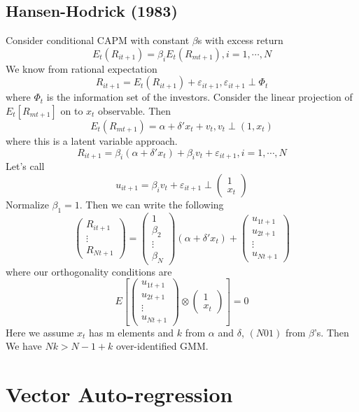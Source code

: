 \documentclass[11pt, a4paper, oneside]{article}
\theoremstyle{definition}
\theoremstyle{proposition}
\theoremstyle{corollary}
\theoremstyle{lemma}
\theoremstyle{theorem}
\begin{document}
\subsection{Hansen-Hodrick (1983)}
Consider conditional CAPM with constant $\beta$s with excess return 
$$E_t(R_{it+1}) = \beta_iE_t(R_{mt+1}), i =1, \cdots, N$$
We know from rational expectation 
$$R_{it+1} = E_t(R_{it+1}) + \varepsilon_{it+1}, \varepsilon_{it+1} \perp \Phi_t$$ where $\Phi_t$ is the information set of the investors. Consider the linear projection of $E_t[R_{mt+1}]$ on to $x_t$ observable. Then
$$E_t(R_{mt+1}) =\alpha + \delta'x_t + v_t, v_t \perp (1, x_t)$$
where this is a latent variable approach. 
$$R_{it+1} = \beta_i (\alpha + \delta' x_t) + \beta_i v_t + \varepsilon_{it+1}, i = 1, \cdots, N$$
Let's call $$u_{it+1} = \beta_i v_t + \varepsilon_{it+1} \perp \begin{pmatrix} 1\\ x_t\end{pmatrix}$$
Normalize $\beta_1 = 1$. Then we can write the following
$$\begin{pmatrix} R_{it+1} \\ \vdots \\ R_{Nt +1}\end{pmatrix} = \begin{pmatrix}1 \\ \beta_2 \\ \vdots \\ \beta_N\end{pmatrix}(\alpha + \delta'x_t) +  \begin{pmatrix}u_{1t+1} \\ u_{2t+1} \\ \vdots \\ u_{Nt+1}\end{pmatrix}$$ 
where our orthogonality conditions are $$E\left[\begin{pmatrix}u_{1t+1} \\ u_{2t+1} \\ \vdots \\ u_{Nt+1}\end{pmatrix}\otimes\begin{pmatrix} 1\\ x_t\end{pmatrix}\right] = 0$$
Here we assume $x_t$ has m elements and $k$ from $\alpha$ and $\delta$, $(N01)$ from $\beta$'s. Then We have $Nk > N-1+k$ over-identified GMM. 

\section{Vector Auto-regression}
\end{document}
